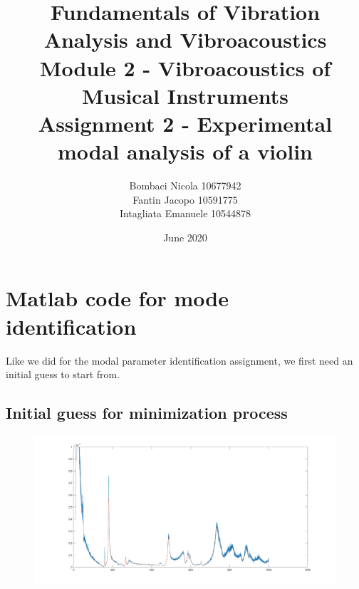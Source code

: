 \documentclass[a4paper,12pt,oneside]{article}
\title{Fundamentals of Vibration Analysis and Vibroacoustics \\
	Module 2 - Vibroacoustics of Musical Instruments \\
	Assignment 2 - Experimental modal analysis of a violin}
\author{Bombaci Nicola 10677942 \\
	Fantin Jacopo 10591775 \\
	Intagliata Emanuele 10544878}
\date{June 2020}
\begin{document}
\maketitle

\vspace{100pt}

\section{Matlab code for mode identification}

Like we did for the modal parameter identification assignment, we first need an initial guess to start from.

\subsection{Initial guess for minimization process}



\begin{figure}[h]
	\hspace{-70pt}
	\includegraphics[scale=0.4]{una_frf_a_caso_passabassata}
\end{figure}
\end{document}
